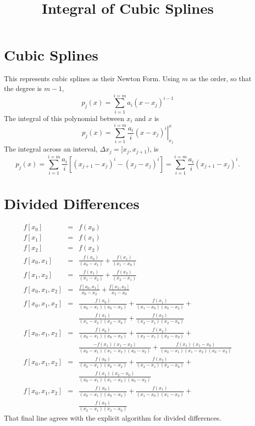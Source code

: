 \documentclass{article}
\title{Integral of Cubic Splines}
\begin{document}
\section{Cubic Splines}
This represents cubic splines as their Newton Form. Using $m$ as the order, so that
the degree is $m-1$,
\begin{equation}
 p_j(x) = \sum_{i=1}^{i=m} a_i(x-x_j)^{i-1}
\end{equation}
The integral of this polynomial between $x_i$ and $x$ is
\begin{equation}
 p_j(x) = \sum_{i=1}^{i=m} \left.\frac{a_i}{i}(x-x_j)^i\right|_{x_j}^{x}
\end{equation}
The integral across an interval, $\Delta x_j=[x_j,x_{j+1})$, is
\begin{equation}
 p_j(x) = \sum_{i=1}^{i=m} \frac{a_i}{i}\left[(x_{j+1}-x_{j})^i - (x_j-x_j)^i\right] = \sum_{i=1}^{i=m} \frac{a_i}{i}(x_{j+1}-x_{j})^i.
\end{equation}

\section{Divided Differences}
\begin{eqnarray}
f[x_0] & = & f(x_0) \\
f[x_1] & = & f(x_1) \\
f[x_2] & = & f(x_2) \\
f[x_0,x_1] & = & \frac{f(x_0)}{(x_0-x_1)} + \frac{f(x_1)}{(x_1-x_0)} \\
f[x_1,x_2] & = & \frac{f(x_1)}{(x_1-x_2)} + \frac{f(x_2)}{(x_2-x_1)} \\
f[x_0,x_1,x_2] & = & \frac{f[x_0,x_1]}{x_0-x_2} + \frac{f[x_1,x_2]}{x_2-x_0} \\
f[x_0,x_1,x_2] & = & \frac{f(x_0)}{(x_0-x_1)(x_0-x_2)} + \frac{f(x_1)}{(x_1-x_0)(x_0-x_2)} +  \\
& &\frac{f(x_1)}{(x_1-x_2)(x_2-x_0)} +\frac{f(x_2)}{(x_2-x_1)(x_2-x_0)} \\
f[x_0,x_1,x_2] & = & \frac{f(x_0)}{(x_0-x_1)(x_0-x_2)}+\frac{f(x_2)}{(x_2-x_1)(x_2-x_0)} + \\
& & \frac{-f(x_1)(x_1-x_2)}{(x_0-x_1)(x_1-x_2)(x_0-x_2)} +
\frac{f(x_1)(x_1-x_0)}{(x_0-x_1)(x_1-x_2)(x_0-x_2)}  \\
f[x_0,x_1,x_2] & = & \frac{f(x_0)}{(x_0-x_1)(x_0-x_2)}+\frac{f(x_2)}{(x_2-x_1)(x_2-x_0)} + \\
& & \frac{f(x_1)(x_2-x_0)}{(x_0-x_1)(x_1-x_2)(x_0-x_2)} \\
f[x_0,x_1,x_2] & = & \frac{f(x_0)}{(x_0-x_1)(x_0-x_2)}+\frac{f(x_1)}{(x_1-x_0)(x_1-x_2)} + \\
& & \frac{f(x_2)}{(x_2-x_1)(x_2-x_0)}
\end{eqnarray}
That final line agrees with the explicit algorithm for divided differences.
\end{document}
